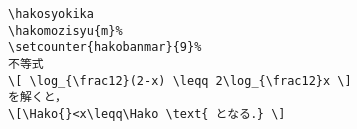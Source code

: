 \begin{verbatim}
\hakosyokika
\hakomozisyu{m}%
\setcounter{hakobanmar}{9}%
不等式
\[ \log_{\frac12}(2-x) \leqq 2\log_{\frac12}x \]
を解くと，
\[\Hako{}<x\leqq\Hako \text{ となる．} \]
\end{verbatim}

